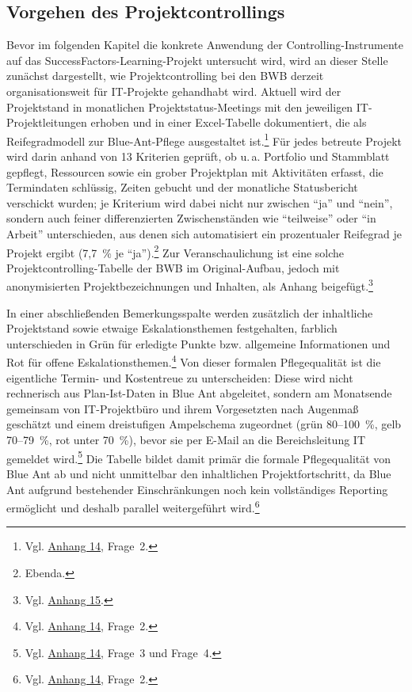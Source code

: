 \documentclass[
    12pt, 
    a4paper,
    ]{scrartcl} %
\begin{document}
\subsection{Vorgehen des Projektcontrollings} 
Bevor im folgenden Kapitel die konkrete Anwendung der Controlling-Instrumente auf das SuccessFactors-Learning-Projekt untersucht wird, wird an dieser Stelle zunächst dargestellt, wie Projektcontrolling bei den BWB derzeit organisationsweit für IT-Projekte gehandhabt wird. Aktuell wird der Projektstand in monatlichen Projektstatus-Meetings mit den jeweiligen IT-Projektleitungen erhoben und in einer Excel-Tabelle dokumentiert, die als Reifegradmodell zur Blue-Ant-Pflege ausgestaltet ist.\footnote{Vgl. \hyperref[sec:Anhang14]{Anhang 14}, Frage~2.} Für jedes betreute Projekt wird darin anhand von 13 Kriterien geprüft, ob u.\,a. Portfolio und Stammblatt gepflegt, Ressourcen sowie ein grober Projektplan mit Aktivitäten erfasst, die Termindaten schlüssig, Zeiten gebucht und der monatliche Statusbericht verschickt wurden; je Kriterium wird dabei nicht nur zwischen \enquote{ja} und \enquote{nein}, sondern auch feiner differenzierten Zwischenständen wie \enquote{teilweise} oder \enquote{in Arbeit} unterschieden, aus denen sich automatisiert ein prozentualer Reifegrad je Projekt ergibt (7,7~\% je \enquote{ja}).\footnote{Ebenda.} Zur Veranschaulichung ist eine solche Projektcontrolling-Tabelle der BWB im Original-Aufbau, jedoch mit anonymisierten Projektbezeichnungen und Inhalten, als Anhang beigefügt.\footnote{Vgl. \hyperref[sec:Anhang15]{Anhang 15}.}

In einer abschließenden Bemerkungsspalte werden zusätzlich der inhaltliche Projektstand sowie etwaige Eskalationsthemen festgehalten, farblich unterschieden in Grün für erledigte Punkte bzw. allgemeine Informationen und Rot für offene Eskalationsthemen.\footnote{Vgl. \hyperref[sec:Anhang14]{Anhang 14}, Frage~2.} Von dieser formalen Pflegequalität ist die eigentliche Termin- und Kostentreue zu unterscheiden: Diese wird nicht rechnerisch aus Plan-Ist-Daten in Blue Ant abgeleitet, sondern am Monatsende gemeinsam von IT-Projektbüro und ihrem Vorgesetzten nach Augenmaß geschätzt und einem dreistufigen Ampelschema zugeordnet (grün 80–100~\%, gelb 70–79~\%, rot unter 70~\%), bevor sie per E-Mail an die Bereichsleitung IT gemeldet wird.\footnote{Vgl. \hyperref[sec:Anhang14]{Anhang 14}, Frage~3 und Frage~4.} Die Tabelle bildet damit primär die formale Pflegequalität von Blue Ant ab und nicht unmittelbar den inhaltlichen Projektfortschritt, da Blue Ant aufgrund bestehender Einschränkungen noch kein vollständiges Reporting ermöglicht und deshalb parallel weitergeführt wird.\footnote{Vgl. \hyperref[sec:Anhang14]{Anhang 14}, Frage~2.}
\end{document}
